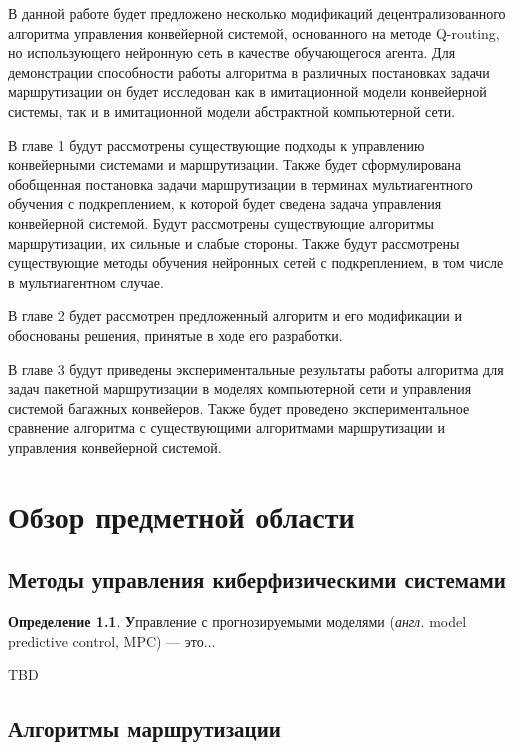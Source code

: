 \documentclass[specification,annotation,times]{itmo-student-thesis}
\theoremstyle{definition}
\newtheorem{definition-ru}{Определение}
\begin{document}
В данной работе будет предложено несколько модификаций децентрализованного
алгоритма управления конвейерной системой, основанного на методе Q-routing, но
использующего нейронную сеть в качестве обучающегося агента. Для демонстрации
способности работы алгоритма в различных постановках задачи маршрутизации он
будет исследован как в имитационной модели конвейерной системы, так и в
имитационной модели абстрактной компьютерной сети.

В главе 1 будут рассмотрены существующие подходы к управлению конвейерными
системами и маршрутизации. Также будет сформулирована обобщенная постановка
задачи маршрутизации в терминах мультиагентного обучения с подкреплением, к
которой будет сведена задача управления конвейерной системой. Будут рассмотрены
существующие алгоритмы маршрутизации, их сильные и слабые стороны. Также будут
рассмотрены существующие методы обучения нейронных сетей с подкреплением, в том
числе в мультиагентном случае.

В главе 2 будет рассмотрен предложенный алгоритм и его модификации и обоснованы
решения, принятые в ходе его разработки.

В главе 3 будут приведены экспериментальные результаты работы алгоритма для
задач пакетной маршрутизации в моделях компьютерной сети и управления системой багажных
конвейеров. Также будет проведено экспериментальное сравнение алгоритма с
существующими алгоритмами маршрутизации и управления конвейерной системой.

\chapter{Обзор предметной области}

\startrelatedwork

\section{Методы управления киберфизическими системами}

\begin{definition-ru}
  \textbf Управление с прогнозируемыми моделями (\textit{англ.} model predictive
  control, MPC) --- это...
\end{definition-ru}

TBD

\section{Алгоритмы маршрутизации}
\end{document}
